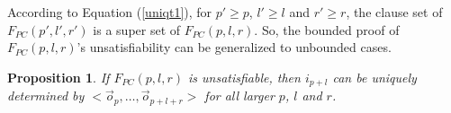 \documentclass[twocolumn]{article}
\newtheorem{proposition}{Proposition}
\begin{document}
According to Equation (\ref{uniqt1}),
for $p'\ge p$, $l'\ge l$ and $r'\ge r$,
the clause set of $F_{PC}(p',l',r')$ is a super set of $F_{PC}(p,l,r)$.
So,
the bounded proof of $F_{PC}(p,l,r)$'s unsatisfiability
can be generalized to unbounded cases.


\begin{proposition}\label{prop_pc1}
If $F_{PC}(p,l,r)$ is unsatisfiable,
then $i_{p+l}$ can be uniquely determined by $<\vec{o}_{p},\dots,\vec{o}_{p+l+r}>$ for all larger $p$, $l$ and $r$.
\end{proposition}

% 
% 
\end{document}
